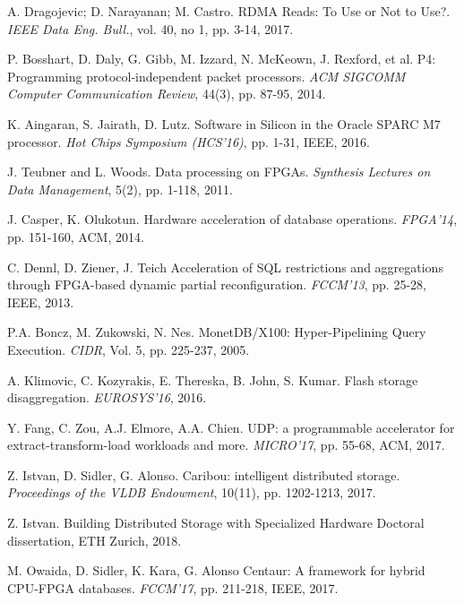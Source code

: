 \documentclass[11pt]{article}
\begin{document}
\begin{thebibliography}{10}
 A. Dragojevic; D. Narayanan; M. Castro. \newblock RDMA Reads: To Use or Not to Use?. \newblock \emph{IEEE Data Eng. Bull.}, vol. 40, no 1, pp. 3-14, 2017.

 P. Bosshart, D. Daly, G. Gibb, M. Izzard, N. McKeown, J. Rexford, et al. \newblock P4: Programming protocol-independent packet processors. \newblock \emph{ACM SIGCOMM Computer Communication Review}, 44(3), pp. 87-95, 2014.

 K. Aingaran, S. Jairath, D. Lutz. \newblock Software in Silicon in the Oracle SPARC M7 processor. \newblock \emph{Hot Chips Symposium (HCS'16)}, pp. 1-31, IEEE, 2016.

 J. Teubner and L. Woods. \newblock Data processing on FPGAs. \newblock \emph{Synthesis Lectures on Data Management}, 5(2), pp. 1-118, 2011.

 J. Casper, K. Olukotun. \newblock Hardware acceleration of database operations. \newblock \emph{FPGA'14}, pp. 151-160, ACM, 2014.

 C. Dennl, D. Ziener, J. Teich \newblock Acceleration of SQL restrictions and aggregations through FPGA-based dynamic partial reconfiguration. \newblock \emph{FCCM'13}, pp. 25-28, IEEE, 2013.

 P.A. Boncz, M. Zukowski, N. Nes. \newblock MonetDB/X100: Hyper-Pipelining Query Execution. \newblock \emph{CIDR}, Vol. 5, pp. 225-237, 2005.

 A. Klimovic, C. Kozyrakis, E. Thereska, B. John, S. Kumar. \newblock Flash storage disaggregation. \newblock \emph{EUROSYS'16}, 2016.

 Y. Fang, C. Zou, A.J. Elmore, A.A. Chien. \newblock UDP: a programmable accelerator for extract-transform-load workloads and more. \newblock \emph{MICRO'17}, pp. 55-68, ACM, 2017.

 Z. Istvan, D. Sidler, G. Alonso. \newblock Caribou: intelligent distributed storage. \newblock \emph{Proceedings of the VLDB Endowment}, 10(11), pp. 1202-1213, 2017.

 Z. Istvan. \newblock Building Distributed Storage with Specialized Hardware \newblock Doctoral dissertation, ETH Zurich, 2018.

 M. Owaida, D. Sidler, K. Kara, G. Alonso \newblock Centaur: A framework for hybrid CPU-FPGA databases. \newblock \emph{FCCM'17}, pp. 211-218, IEEE, 2017.


\end{thebibliography}
\end{document}
